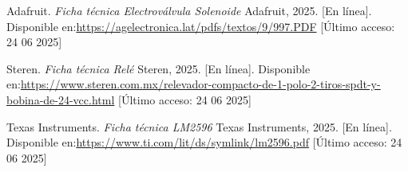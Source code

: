 \documentclass[pdflatex,sn-mathphys-num]{sn-jnl}%
\theoremstyle{thmstyleone}%
\theoremstyle{thmstyletwo}%
\theoremstyle{thmstylethree}%
\begin{document}
\begin{multicols}{2}
\begin{thebibliography}{4}
Adafruit.
\textit{Ficha técnica Electroválvula Solenoide}
Adafruit, 2025.
[En línea]. Disponible en:\url{https://agelectronica.lat/pdfs/textos/9/997.PDF}
[Último acceso: 24 06 2025] 

Steren.
\textit{Ficha técnica Relé}
Steren, 2025.
[En línea]. Disponible en:\url{https://www.steren.com.mx/relevador-compacto-de-1-polo-2-tiros-spdt-y-bobina-de-24-vcc.html}
[Último acceso: 24 06 2025] 

Texas Instruments.
\textit{Ficha técnica LM2596}
Texas Instruments, 2025.
[En línea]. Disponible en:\url{https://www.ti.com/lit/ds/symlink/lm2596.pdf}
[Último acceso: 24 06 2025] 

\end{thebibliography}
\end{multicols}
\end{document}
